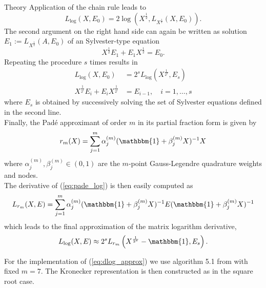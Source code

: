 \begin{chapter}{Theory}
Application of the chain rule leads to
\begin{equation}
    L_{\log}(X,E_0) = 2\log\left(X^{\frac{1}{2}},L_{X^{\frac{1}{2}}}(X,E_0)\right).
\end{equation}
The second argument on the right hand side can again be written as solution $E_1:=L_{X^{\frac{1}{2}}}(A,E_0)$ of an Sylvester-type equation
\begin{equation}
    X^{\frac{1}{2}}E_1+E_{1}X^{\frac{1}{2}}=E_0.
\end{equation}
Repeating the procedure $s$ times results in
\begin{align}
    L_{\log}(X,E_0)&=2^sL_{\log}\left(X^{\frac{1}{2^s}},E_s\right)\\
    X^{\frac{1}{2^{i}}}E_i+E_iX^{\frac{1}{2^{i}}}&=E_{i-1},\quad i=1,\ldots,s
\end{align}
where $E_s$ is obtained by successively solving the set of Sylvester equations defined in the second line.\\

Finally, the Pad\'{e} approximant of order $m$ in its partial fraction form \cite{HighamPade} is given by
\begin{equation}
    \label{eq:pade_log}
    r_m(X) = \sum_{j=1}^{m}\alpha_j^{(m)}(\mathbbm{1}+\beta_j^{(m)}X)^{-1}X
\end{equation}
where $\alpha_{j}^{(m)},\beta_{j}^{(m)}\in (0,1)$ are the $m$-point Gauss-Legendre quadrature weights and nodes.\\

The derivative of (\ref{eq:pade_log}) is then easily computed as 
\begin{equation}
    L_{r_m}(X,E) = \sum_{j=1}^m\alpha_j^{(m)}(\mathbbm{1}+\beta_j^{(m)}X)^{-1}E(\mathbbm{1}+\beta_j^{(m)}X)^{-1}
\end{equation}
which leads to the final approximation of the matrix logarithm derivative, 
\begin{equation}
    \label{eq:dlog_approx}
    L_{\log}(X,E)\approx 2^{s}L_{r_m}\left(X^{\frac{1}{2^s}}-\mathbbm{1},E_s \right).
\end{equation}

For the implementation of (\ref{eq:dlog_approx}) we use algorithm 5.1 from \cite{AlmohyFrechet} with fixed $m=7$.
The Kronecker representation is then constructed as in the square root case.








\end{chapter}

